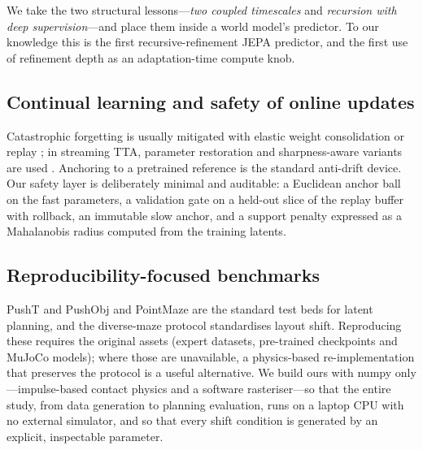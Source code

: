 We take the two structural lessons---\emph{two coupled timescales} and \emph{recursion with
deep supervision}---and place them inside a world model's predictor. To our knowledge this is
the first recursive-refinement JEPA predictor, and the first use of refinement depth as an
adaptation-time compute knob.

\subsection{Continual learning and safety of online updates}

Catastrophic forgetting \cite{mccloskey-1989-forgetting} is usually mitigated with elastic
weight consolidation \cite{kirkpatrick-2017-ewc} or replay \cite{riemer-2019-replay}; in
streaming TTA, parameter restoration and sharpness-aware variants are used
\cite{niu-2023-stable,wang-2022-cotta}. Anchoring to a pretrained reference is the standard
anti-drift device. Our safety layer is deliberately minimal and auditable: a Euclidean anchor
ball on the fast parameters, a validation gate on a held-out slice of the replay buffer with
rollback, an immutable slow anchor, and a support penalty expressed as a Mahalanobis radius
computed from the training latents.

\subsection{Reproducibility-focused benchmarks}

PushT and PushObj \cite{chi-2025-diffusion-policy,zhou-2025-dinowm} and PointMaze
\cite{fu-2021-d4rl} are the standard test beds for latent planning, and the diverse-maze
protocol \cite{zhang-2026-hierarchical} standardises layout shift. Reproducing these requires
the original assets (expert datasets, pre-trained checkpoints and MuJoCo models); where those
are unavailable, a physics-based re-implementation that preserves the protocol is a useful
alternative. We build ours with numpy only---impulse-based contact physics and a software
rasteriser---so that the entire study, from data generation to planning evaluation, runs on a
laptop CPU with no external simulator, and so that every shift condition is generated by an
explicit, inspectable parameter.
